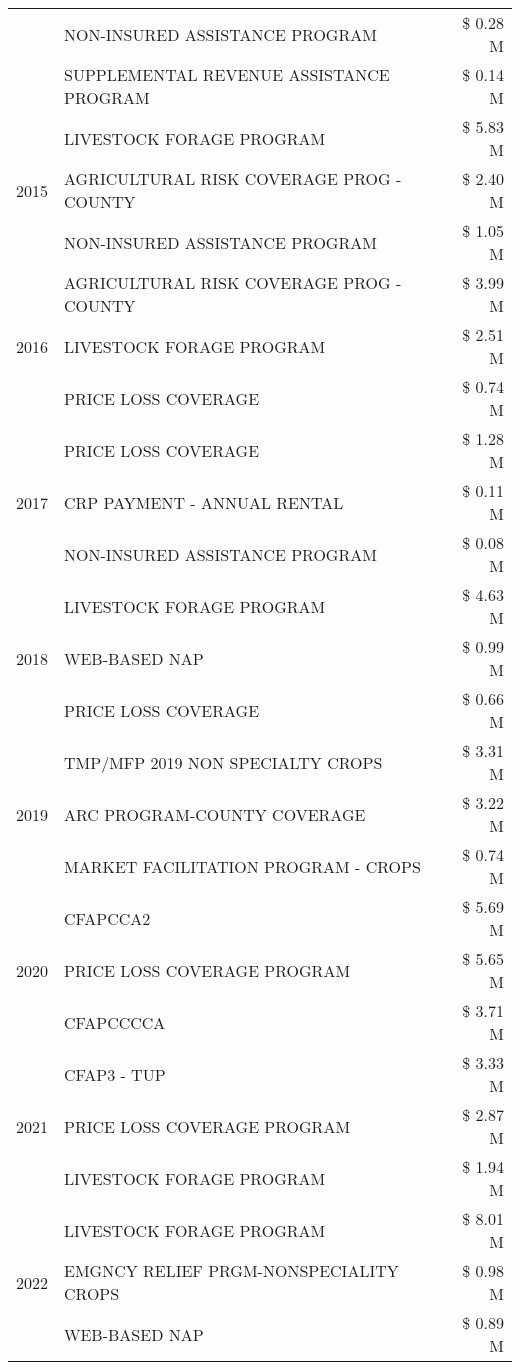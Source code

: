 \begin{tabular}{llr}
 & NON-INSURED ASSISTANCE PROGRAM & \$ 0.28 M \\
 & SUPPLEMENTAL REVENUE ASSISTANCE PROGRAM & \$ 0.14 M \\
\cline{1-3}
\multirow[t]{3}{*}{2015} & LIVESTOCK FORAGE PROGRAM & \$ 5.83 M \\
 & AGRICULTURAL RISK COVERAGE PROG - COUNTY & \$ 2.40 M \\
 & NON-INSURED ASSISTANCE PROGRAM & \$ 1.05 M \\
\cline{1-3}
\multirow[t]{3}{*}{2016} & AGRICULTURAL RISK COVERAGE PROG - COUNTY & \$ 3.99 M \\
 & LIVESTOCK FORAGE PROGRAM & \$ 2.51 M \\
 & PRICE LOSS COVERAGE & \$ 0.74 M \\
\cline{1-3}
\multirow[t]{3}{*}{2017} & PRICE LOSS COVERAGE & \$ 1.28 M \\
 & CRP PAYMENT - ANNUAL RENTAL & \$ 0.11 M \\
 & NON-INSURED ASSISTANCE PROGRAM & \$ 0.08 M \\
\cline{1-3}
\multirow[t]{3}{*}{2018} & LIVESTOCK FORAGE PROGRAM & \$ 4.63 M \\
 & WEB-BASED NAP & \$ 0.99 M \\
 & PRICE LOSS COVERAGE & \$ 0.66 M \\
\cline{1-3}
\multirow[t]{3}{*}{2019} & TMP/MFP 2019 NON SPECIALTY CROPS & \$ 3.31 M \\
 & ARC PROGRAM-COUNTY COVERAGE & \$ 3.22 M \\
 & MARKET FACILITATION PROGRAM - CROPS & \$ 0.74 M \\
\cline{1-3}
\multirow[t]{3}{*}{2020} & CFAPCCA2 & \$ 5.69 M \\
 & PRICE LOSS COVERAGE PROGRAM & \$ 5.65 M \\
 & CFAPCCCCA & \$ 3.71 M \\
\cline{1-3}
\multirow[t]{3}{*}{2021} & CFAP3 - TUP & \$ 3.33 M \\
 & PRICE LOSS COVERAGE PROGRAM & \$ 2.87 M \\
 & LIVESTOCK FORAGE PROGRAM & \$ 1.94 M \\
\cline{1-3}
\multirow[t]{3}{*}{2022} & LIVESTOCK FORAGE PROGRAM & \$ 8.01 M \\
 & EMGNCY RELIEF PRGM-NONSPECIALITY CROPS & \$ 0.98 M \\
 & WEB-BASED NAP & \$ 0.89 M \\
\cline{1-3}
\bottomrule
\end{tabular}
